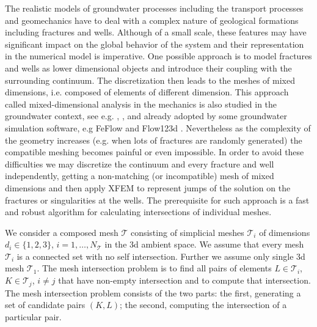 \documentclass{elsarticle}
\begin{document}
The realistic models of groundwater processes including the transport processes and geomechanics have to deal with 
a complex nature of geological formations including fractures and wells. Although of a small scale, these features may have significant impact 
on the global behavior of the system and their representation in the numerical model is imperative.
One possible approach is to model fractures and wells as lower dimensional objects and introduce their coupling with the surrounding continuum. 
The discretization then leads to the meshes of mixed dimensions, i.e. composed of elements of different dimension. This approach 
called mixed-dimensional analysis in the mechanics \cite{bournival_mesh-geometry_2008} is also studied in the groundwater context, see e.g. 
\cite{martin_modeling_2005}, \cite{fumagalli_numerical_2011}, \cite{brezina_analysis_2015} and 
already adopted by some groundwater simulation software, e.g FeFlow \cite{trefry_feflow:_2007} and Flow123d \cite{flow123d}.
Nevertheless as the complexity of the geometry increases (e.g. when lots of fractures are randomly generated) the compatible meshing becomes painful or even 
impossible. In order to avoid these difficulties we may discretize the continuum and every fracture and well independently, getting a non-matching 
(or incompatible) mesh of mixed dimensions and then apply XFEM to represent jumps of the solution on the fractures or singularities 
at the wells. The prerequisite for such approach is a fast and robust algorithm for calculating intersections of individual meshes.

We consider a composed mesh $\mathcal T$ consisting of simplicial meshes $\mathcal T_i$ of dimensions $d_i \in \{1,2,3\}$, $i=1,\dots,N_\mathcal{T}$
in the 3d ambient space. We assume that every mesh $\mathcal T_i$ is a connected set with no self intersection.
Further we assume only single 3d mesh $\mathcal{T}_1$.
The mesh intersection problem is to find all pairs of elements $L\in \mathcal{T}_i$, $K\in \mathcal{T}_j$, $i\ne j$ that have non-empty intersection 
and to compute that intersection. The mesh intersection problem consists of the two parts: the first, generating a set of candidate pairs $(K, L)$; the second, computing the intersection of a particular pair.
\end{document}
